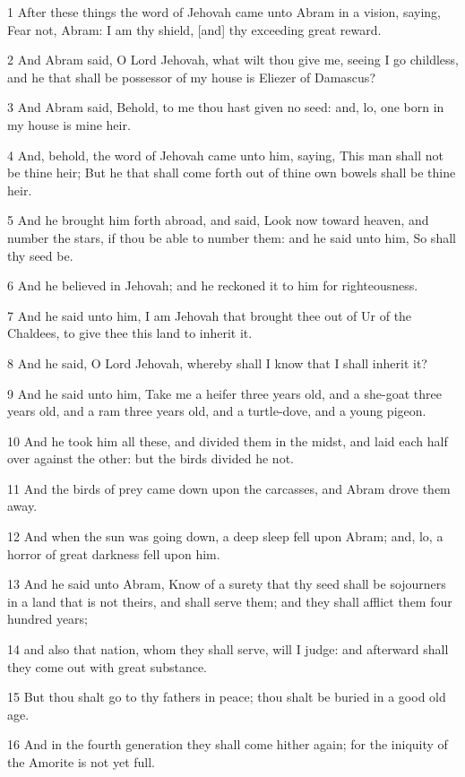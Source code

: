 \par 1 After these things the word of Jehovah came unto Abram in a vision, saying, Fear not, Abram: I am thy shield, [and] thy exceeding great reward.
\par 2 And Abram said, O Lord Jehovah, what wilt thou give me, seeing I go childless, and he that shall be possessor of my house is Eliezer of Damascus?
\par 3 And Abram said, Behold, to me thou hast given no seed: and, lo, one born in my house is mine heir.
\par 4 And, behold, the word of Jehovah came unto him, saying, This man shall not be thine heir; But he that shall come forth out of thine own bowels shall be thine heir.
\par 5 And he brought him forth abroad, and said, Look now toward heaven, and number the stars, if thou be able to number them: and he said unto him, So shall thy seed be.
\par 6 And he believed in Jehovah; and he reckoned it to him for righteousness.
\par 7 And he said unto him, I am Jehovah that brought thee out of Ur of the Chaldees, to give thee this land to inherit it.
\par 8 And he said, O Lord Jehovah, whereby shall I know that I shall inherit it?
\par 9 And he said unto him, Take me a heifer three years old, and a she-goat three years old, and a ram three years old, and a turtle-dove, and a young pigeon.
\par 10 And he took him all these, and divided them in the midst, and laid each half over against the other: but the birds divided he not.
\par 11 And the birds of prey came down upon the carcasses, and Abram drove them away.
\par 12 And when the sun was going down, a deep sleep fell upon Abram; and, lo, a horror of great darkness fell upon him.
\par 13 And he said unto Abram, Know of a surety that thy seed shall be sojourners in a land that is not theirs, and shall serve them; and they shall afflict them four hundred years;
\par 14 and also that nation, whom they shall serve, will I judge: and afterward shall they come out with great substance.
\par 15 But thou shalt go to thy fathers in peace; thou shalt be buried in a good old age.
\par 16 And in the fourth generation they shall come hither again; for the iniquity of the Amorite is not yet full.
